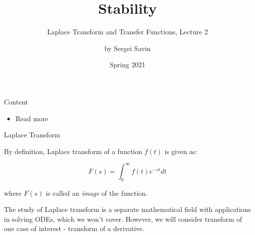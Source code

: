 \documentclass{beamer}
\title{Stability}
\subtitle{ Laplace Transform and Transfer Functions, Lecture 2}
\author{by Sergei Savin}
\date{Spring 2021}
\begin{document}
\maketitle


\begin{frame}{Content}

\begin{itemize}
\item Read more
\end{itemize}

\end{frame}



\begin{frame}{Laplace Transform}
\begin{flushleft}

By definition, Laplace transform of a function $f(t)$ is given as:

\begin{equation}
    F(s) = \int_0^\infty f(t) e^{-st}dt
\end{equation}

where $F(s)$ is called an \emph{image} of the function.

\bigskip

The study of Laplace transform is a separate mathematical field with applications in solving ODEs, which we won't cover. However, we will consider transform of one case of interest - transform of a derivative. 

\end{flushleft}
\end{frame}
\end{document}
